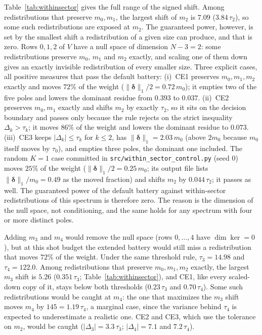 \documentclass[aps,prb,onecolumn,superscriptaddress,longbibliography,floatfix]{revtex4-2}
\begin{document}
Table~\ref{tab:withinsector} gives the full range of the signed shift. Among redistributions that preserve $m_0,m_1$, the largest shift of $m_2$ is $7.09$ ($3.84\,\tau_2$), so some such redistributions are exposed at $m_2$. The guaranteed power, however, is set by the smallest shift a redistribution of a given size can produce, and that is zero. Rows $0,1,2$ of $V$ have a null space of dimension $N-3=2$: some redistributions preserve $m_0$, $m_1$ and $m_2$ exactly, and scaling one of them down gives an exactly invisible redistribution of every smaller size. Three explicit cases, all positive measures that pass the default battery: (i)~CE1 preserves $m_0,m_1,m_2$ exactly and moves $72\%$ of the weight ($\|\bm{\delta}\|_1/2=0.72\,m_0$); it empties two of the five poles and lowers the dominant residue from $0.393$ to $0.037$. (ii)~CE2 preserves $m_0,m_1$ exactly and shifts $m_2$ by exactly $\tau_2$, so it sits on the decision boundary and passes only because the rule rejects on the strict inequality $\Delta_k>\tau_k$; it moves $86\%$ of the weight and lowers the dominant residue to $0.073$. (iii)~CE3 keeps $|\Delta_k|\le\tau_k$ for $k\le2$, has $\|\bm{\delta}\|_1=2.03\,m_0$ (above $2m_0$ because $m_0$ itself moves by $\tau_0$), and empties three poles, the dominant one included. The random $K=1$ case committed in \texttt{src/\allowbreak within\_sector\_control.py} (seed $0$) moves $25\%$ of the weight ($\|\bm{\delta}\|_1/2=0.25\,m_0$; its output file lists $\|\bm{\delta}\|_1/m_0=0.49$ as the moved fraction) and shifts $m_2$ by $0.044\,\tau_2$; it passes as well. The guaranteed power of the default battery against within-sector redistributions of this spectrum is therefore zero. The reason is the dimension of the null space, not conditioning, and the same holds for any spectrum with four or more distinct poles.

Adding $m_3$ and $m_4$ would remove the null space (rows $0,\dots,4$ have $\dim\ker=0$), but at this shot budget the extended battery would still miss a redistribution that moves $72\%$ of the weight. Under the same threshold rule, $\tau_3=14.98$ and $\tau_4=122.0$. Among redistributions that preserve $m_0,m_1,m_2$ exactly, the largest $m_3$ shift is $5.26$ ($0.351\,\tau_3$; Table~\ref{tab:withinsector}), and CE1, like every scaled-down copy of it, stays below both thresholds ($0.23\,\tau_3$ and $0.70\,\tau_4$). Some such redistributions would be caught at $m_4$: the one that maximizes the $m_3$ shift moves $m_4$ by $145=1.19\,\tau_4$, a marginal case, since the variance behind $\tau_4$ is expected to underestimate a realistic one. CE2 and CE3, which use the tolerance on $m_2$, would be caught ($|\Delta_3|=3.3\,\tau_3$; $|\Delta_4|=7.1$ and $7.2\,\tau_4$).
\end{document}
